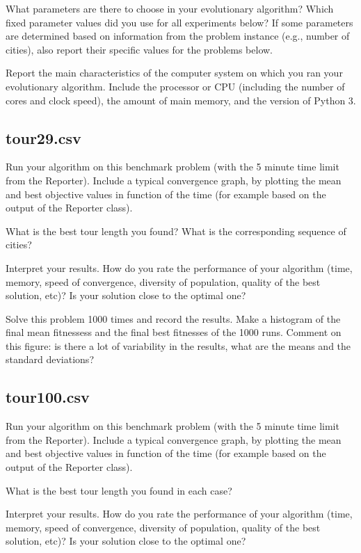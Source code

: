 \documentclass[a4paper,10pt]{article}
\newcommand{\ReplaceMe}[1]{{\color{blue}#1}}
\begin{document}
\ReplaceMe{What parameters are there to choose in your evolutionary algorithm? Which fixed parameter values did you use for all experiments below? If some parameters are determined based on information from the problem instance (e.g., number of cities), also report their specific values for the problems below.

Report the main characteristics of the computer system on which you ran your evolutionary algorithm. Include the processor or CPU (including the number of cores and clock speed), the amount of main memory, and the version of Python 3.}


\subsection{tour29.csv}

\ReplaceMe{Run your algorithm on this benchmark problem (with the 5 minute time limit from the Reporter). Include a typical convergence graph, by plotting the mean and best objective values in function of the time (for example based on the output of the Reporter class). 

What is the best tour length you found? What is the corresponding sequence of cities? 

Interpret your results. How do you rate the performance of your algorithm (time, memory, speed of convergence, diversity of population, quality of the best solution, etc)? Is your solution close to the optimal one?

Solve this problem 1000 times and record the results. Make a histogram of the final mean fitnessess and the final best fitnesses of the 1000 runs. Comment on this figure: is there a lot of variability in the results, what are the means and the standard deviations?}

\subsection{tour100.csv}

\ReplaceMe{Run your algorithm on this benchmark problem (with the 5 minute time limit from the Reporter). Include a typical convergence graph, by plotting the mean and best objective values in function of the time (for example based on the output of the Reporter class). 

What is the best tour length you found in each case? 

Interpret your results. How do you rate the performance of your algorithm (time, memory, speed of convergence, diversity of population, quality of the best solution, etc)? Is your solution close to the optimal one?}
\end{document}
